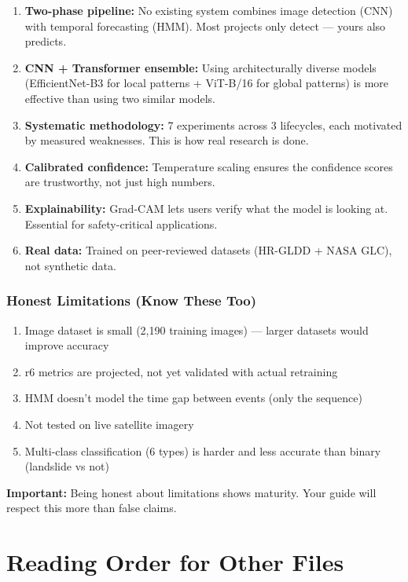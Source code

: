 \documentclass[11pt]{article}
\begin{document}
\begin{enumerate}
    \item \textbf{Two-phase pipeline:} No existing system combines image detection (CNN) with temporal forecasting (HMM). Most projects only detect --- yours also predicts.
    \item \textbf{CNN + Transformer ensemble:} Using architecturally diverse models (EfficientNet-B3 for local patterns + ViT-B/16 for global patterns) is more effective than using two similar models.
    \item \textbf{Systematic methodology:} 7 experiments across 3 lifecycles, each motivated by measured weaknesses. This is how real research is done.
    \item \textbf{Calibrated confidence:} Temperature scaling ensures the confidence scores are trustworthy, not just high numbers.
    \item \textbf{Explainability:} Grad-CAM lets users verify what the model is looking at. Essential for safety-critical applications.
    \item \textbf{Real data:} Trained on peer-reviewed datasets (HR-GLDD + NASA GLC), not synthetic data.
\end{enumerate}

\section{Honest Limitations (Know These Too)}

\begin{enumerate}[noitemsep]
    \item Image dataset is small (2,190 training images) --- larger datasets would improve accuracy
    \item r6 metrics are projected, not yet validated with actual retraining
    \item HMM doesn't model the time gap between events (only the sequence)
    \item Not tested on live satellite imagery
    \item Multi-class classification (6 types) is harder and less accurate than binary (landslide vs not)
\end{enumerate}

\textbf{Important:} Being honest about limitations shows maturity. Your guide will respect this more than false claims.

\part{Reading Order for Other Files}
\end{document}
